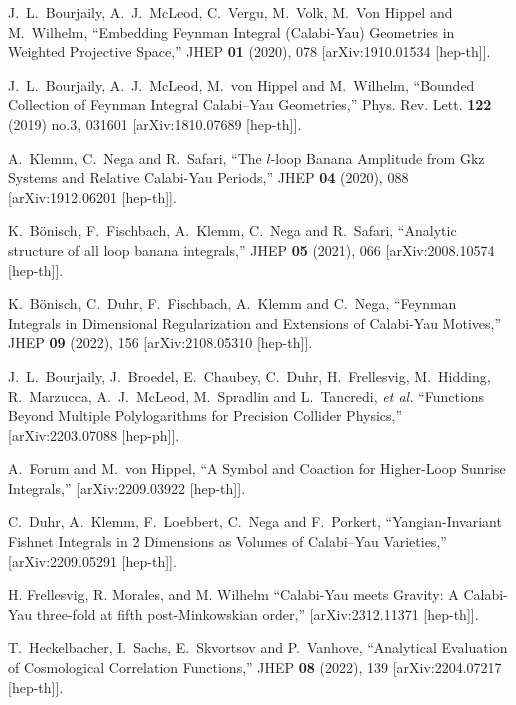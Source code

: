 \documentclass[a4paper,12pt]{article}
\numberwithin{equation}{section}
\numberwithin{figure}{section}
\begin{document}
\begin{thebibliography}{99}
J.~L.~Bourjaily, A.~J.~McLeod, C.~Vergu, M.~Volk, M.~Von Hippel and M.~Wilhelm,
``Embedding Feynman Integral (Calabi-Yau) Geometries in Weighted Projective Space,''
JHEP \textbf{01} (2020), 078
[arXiv:1910.01534 [hep-th]].

J.~L.~Bourjaily, A.~J.~McLeod, M.~von Hippel and M.~Wilhelm,
``Bounded Collection of Feynman Integral Calabi--Yau Geometries,''
Phys. Rev. Lett. \textbf{122} (2019) no.3, 031601
[arXiv:1810.07689 [hep-th]].

A.~Klemm, C.~Nega and R.~Safari,
``The $l$-loop Banana Amplitude from Gkz Systems and Relative Calabi-Yau Periods,''
JHEP \textbf{04} (2020), 088
[arXiv:1912.06201 [hep-th]].

K.~B\"onisch, F.~Fischbach, A.~Klemm, C.~Nega and R.~Safari,
``Analytic structure of all loop banana integrals,''
JHEP \textbf{05} (2021), 066
[arXiv:2008.10574 [hep-th]].


K.~B\"onisch, C.~Duhr, F.~Fischbach, A.~Klemm and C.~Nega,
``Feynman Integrals in Dimensional Regularization and Extensions of Calabi-Yau Motives,''
JHEP \textbf{09} (2022), 156
[arXiv:2108.05310 [hep-th]].

J.~L.~Bourjaily, J.~Broedel, E.~Chaubey, C.~Duhr, H.~Frellesvig, M.~Hidding, R.~Marzucca, A.~J.~McLeod, M.~Spradlin and L.~Tancredi, \textit{et al.}
``Functions Beyond Multiple Polylogarithms for Precision Collider Physics,''
[arXiv:2203.07088 [hep-ph]].


A.~Forum and M.~von Hippel,
``A Symbol and Coaction for Higher-Loop Sunrise Integrals,''
[arXiv:2209.03922 [hep-th]].

C.~Duhr, A.~Klemm, F.~Loebbert, C.~Nega and F.~Porkert,
``Yangian-Invariant Fishnet Integrals in 2 Dimensions as Volumes of Calabi--Yau Varieties,''
[arXiv:2209.05291 [hep-th]].

H. Frellesvig, R. Morales, and M. Wilhelm
``Calabi-Yau meets Gravity: A Calabi-Yau three-fold at fifth post-Minkowskian order,''
[arXiv:2312.11371 [hep-th]].

T.~Heckelbacher, I.~Sachs, E.~Skvortsov and P.~Vanhove,
``Analytical Evaluation of Cosmological Correlation Functions,''
JHEP \textbf{08} (2022), 139
[arXiv:2204.07217 [hep-th]].


\end{thebibliography}
\end{document}
